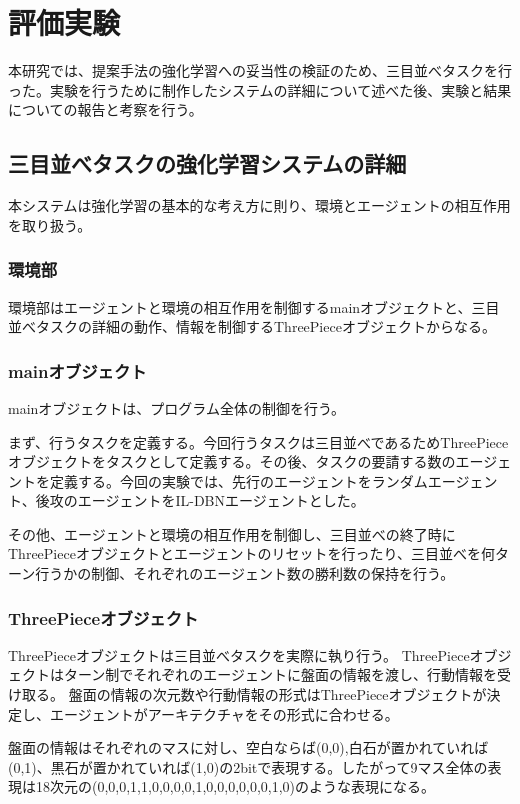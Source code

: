 \chapter{評価実験}
本研究では、提案手法の強化学習への妥当性の検証のため、三目並べタスクを行った。実験を行うために制作したシステムの詳細について述べた後、実験と結果についての報告と考察を行う。

\section{三目並べタスクの強化学習システムの詳細}
本システムは強化学習の基本的な考え方に則り、環境とエージェントの相互作用を取り扱う。

\subsection{環境部}
環境部はエージェントと環境の相互作用を制御するmainオブジェクトと、三目並べタスクの詳細の動作、情報を制御するThreePieceオブジェクトからなる。

\subsection{mainオブジェクト}
mainオブジェクトは、プログラム全体の制御を行う。

まず、行うタスクを定義する。今回行うタスクは三目並べであるためThreePieceオブジェクトをタスクとして定義する。その後、タスクの要請する数のエージェントを定義する。今回の実験では、先行のエージェントをランダムエージェント、後攻のエージェントをIL-DBNエージェントとした。

その他、エージェントと環境の相互作用を制御し、三目並べの終了時にThreePieceオブジェクトとエージェントのリセットを行ったり、三目並べを何ターン行うかの制御、それぞれのエージェント数の勝利数の保持を行う。

\subsection{ThreePieceオブジェクト}
ThreePieceオブジェクトは三目並べタスクを実際に執り行う。
ThreePieceオブジェクトはターン制でそれぞれのエージェントに盤面の情報を渡し、行動情報を受け取る。
盤面の情報の次元数や行動情報の形式はThreePieceオブジェクトが決定し、エージェントがアーキテクチャをその形式に合わせる。

盤面の情報はそれぞれのマスに対し、空白ならば(0,0),白石が置かれていれば(0,1)、黒石が置かれていれば(1,0)の2bitで表現する。したがって9マス全体の表現は18次元の(0,0,0,1,1,0,0,0,0,1,0,0,0,0,0,0,1,0)のような表現になる。

